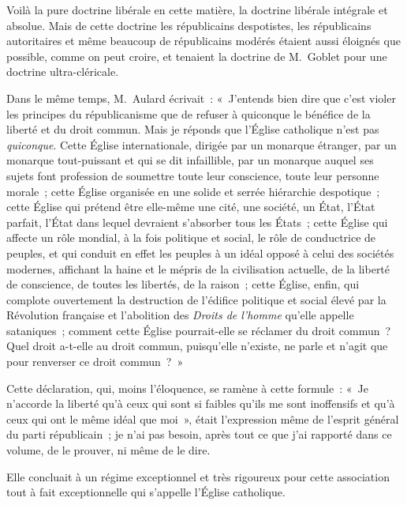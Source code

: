 \documentclass[french,twoside]{book} %
\begin{document}
Voilà la pure doctrine libérale en cette matière, la doctrine libérale intégrale et absolue. Mais de cette doctrine les républicains despotistes, les républicains autoritaires et même beaucoup de républicains modérés étaient aussi éloignés que possible, comme on peut croire, et tenaient la doctrine de M. Goblet pour une doctrine ultra-cléricale.\par
 Dans le même temps, M. Aulard écrivait : « J’entends bien dire que c’est violer les principes du républicanisme que de refuser à quiconque le bénéfice de la liberté et du droit commun. Mais je réponds que l’Église catholique n’est pas {\itshape quiconque}. Cette Église internationale, dirigée par un monarque étranger, par un monarque tout-puissant et qui se dit infaillible, par un monarque auquel ses sujets font profession de soumettre toute leur conscience, toute leur personne morale ; cette Église organisée en une solide et serrée hiérarchie despotique ; cette Église qui prétend être elle-même une cité, une société, un État, l’État parfait, l’État dans lequel devraient s’absorber tous les États ; cette Église qui affecte un rôle mondial, à la fois politique et social, le rôle de conductrice de peuples, et qui conduit en effet les peuples à un idéal opposé à celui des sociétés modernes, affichant la haine et le mépris de la civilisation actuelle, de la liberté de conscience, de toutes les libertés, de la raison ; cette Église, enfin, qui complote ouvertement la destruction de l’édifice politique et social élevé par la Révolution française et l’abolition des \emph{Droits de l’homme} qu’elle appelle sataniques ; comment cette Église pourrait-elle se réclamer du droit commun ? Quel droit a-t-elle au droit commun, puisqu’elle n’existe,  ne parle et n’agit que pour renverser ce droit commun ? »\par
Cette déclaration, qui, moins l’éloquence, se ramène à cette formule : « Je n’accorde la liberté qu’à ceux qui sont si faibles qu’ils me sont inoffensifs et qu’à ceux qui ont le même idéal que moi », était l’expression même de l’esprit général du parti républicain ; je n’ai pas besoin, après tout ce que j’ai rapporté dans ce volume, de le prouver, ni même de le dire.\par
Elle concluait à un régime exceptionnel et très rigoureux pour cette association tout à fait exceptionnelle qui s’appelle l’Église catholique.\par
\end{document}
